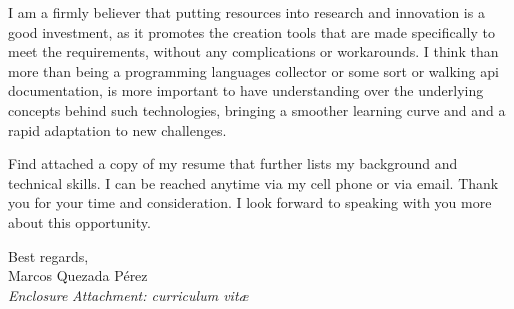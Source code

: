 \documentclass[a4paper,nonstopmode,9.5pt]{article}
\begin{document}
I am a firmly believer that putting resources into research and innovation is a good investment, as it promotes the creation tools that are made specifically to meet the requirements, without any complications or workarounds. I think than more than being a programming languages
collector or some sort or walking api documentation, is more important to have understanding over the underlying concepts behind such technologies, bringing a smoother learning curve and and a rapid adaptation to new challenges.

Find attached a copy of my resume that further lists my background and technical skills. I can be reached anytime via my cell phone or via email. Thank you for your time and consideration. I look forward to speaking with you more about this opportunity.

Best regards,
%
{\\ Marcos Quezada Pérez}\\
%
\vfill%
{\slshape Enclosure}
{\slshape Attachment: curriculum vit\ae{}}
\end{document}
